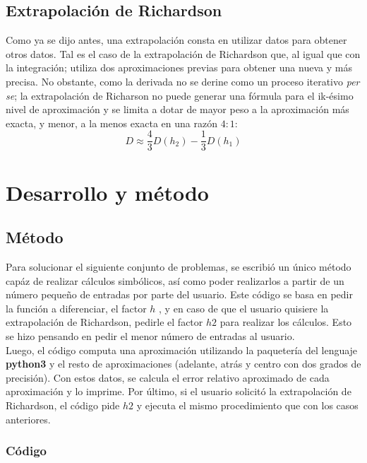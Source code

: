 \documentclass[12pt,oneside,FLEQN]{report}
\begin{document}
{\section{Extrapolación de Richardson}
Como ya se dijo antes, una extrapolación consta en utilizar datos para obtener otros datos. Tal es el caso de la extrapolación de Richardson que, al igual que con la integración; utiliza dos aproximaciones previas para obtener una nueva y más precisa. No obstante, como la derivada no se derine como un proceso iterativo {\it per se}; la extrapolación de Richarson no puede generar una fórmula para el ik-ésimo nivel de aproximación y se limita a dotar de mayor peso a la aproximación más exacta, y menor, a la menos exacta en una razón $4:1$:
\begin{equation}
	D\approx\dfrac{4}{3}D(h_{2})-\dfrac{1}{3}D(h_{1})
\end{equation}
\chapter{Desarrollo y método}
\section{Método}
Para solucionar el siguiente conjunto de problemas, se escribió un único método capáz de realizar cálculos simbólicos, así como poder realizarlos a partir de un número pequeño de entradas por parte del usuario. Este código se basa en pedir la función a diferenciar, el factor $h$ , y en caso de que el usuario quisiere la extrapolación de Richardson, pedirle el factor $h2$ para realizar los cálculos. Esto se hizo pensando en pedir el menor número de entradas al usuario.\\

Luego, el código computa una aproximación utilizando la paquetería del lenguaje {\bf python3} y el resto de aproximaciones (adelante, atrás y centro con dos grados de precisión). Con estos datos, se calcula el error relativo aproximado de cada aproximación y lo imprime. Por último, si el usuario solicitó la extrapolación de Richardson, el código pide $h2$ y ejecuta el mismo procedimiento que con los casos anteriores.
		\subsection{Código}
			
}
\end{document}
